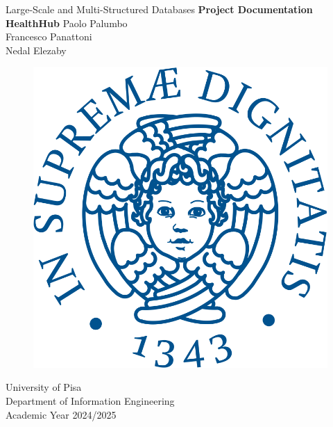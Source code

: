 \begin{titlepage}
	\centering \mbox{} 
	\large Large-Scale and Multi-Structured Databases
	\vfill 
	\Huge \textbf{Project Documentation} \\ \Huge\textbf{HealthHub}
	\vfill \vfill  
	\normalsize 
	Paolo Palumbo \\ 
	Francesco Panattoni \\  
	Nedal Elezaby \\
	\vfill 
	\begin{figure}[h!] 
		\begin{center} 
			\includegraphics[scale=0.5]{resources/unipi.png}
		\end{center}
	\end{figure}
	
	University of Pisa \\
	Department of Information Engineering \\
	Academic Year 2024/2025
	
\end{titlepage}

\thispagestyle{empty}
\cleardoublepage